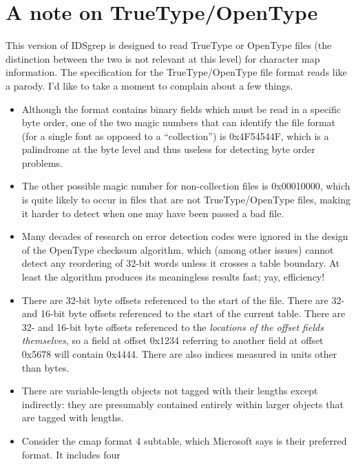\documentclass[twocolumn]{report}
\begin{document}

\section{A note on TrueType/OpenType}

This version of IDSgrep is designed to read TrueType or OpenType files
(the distinction between the two is not relevant at this level) for
character map information.  The specification for the
TrueType/OpenType file format reads like a parody.  I'd like to take a
moment to complain about a few things.

\begin{itemize}
  \item Although the format contains binary fields which must be read
    in a specific byte order, one of the two magic numbers that can
    identify the file format (for a single font as opposed to a
    ``collection'') is 0x4F54544F, which is a palindrome at the byte
    level and thus useless for detecting byte order problems.
  \item The other possible magic number for non-collection files
    is 0x00010000, which is quite likely to occur in files that are
    not TrueType/OpenType files, making it harder to detect when one
    may have been passed a bad file.
  \item Many decades of research on error detection codes were ignored
    in the design of the OpenType checksum algorithm, which (among
    other issues) cannot detect any reordering of 32-bit words unless
    it crosses a table boundary.  At least the algorithm produces its
    meaningless results fast; yay, efficiency!
  \item There are 32-bit byte offsets referenced to the start of the file.
    There are 32- and 16-bit byte offsets referenced to the start of
    the current table.  There are 32- and 16-bit byte offsets
    referenced to the \emph{locations of the offset fields themselves}, so a
    field at offset 0x1234 referring to another field at offset 0x5678
    will contain 0x4444.  There are also indices measured in units
    other than bytes.
  \item There are variable-length objects not tagged
    with their lengths except indirectly: they are presumably
    contained entirely within larger objects that are tagged with lengths.
  \item Consider the cmap format 4 subtable, which Microsoft
    says is their preferred format.  It includes four

\end{itemize}
\end{document}
